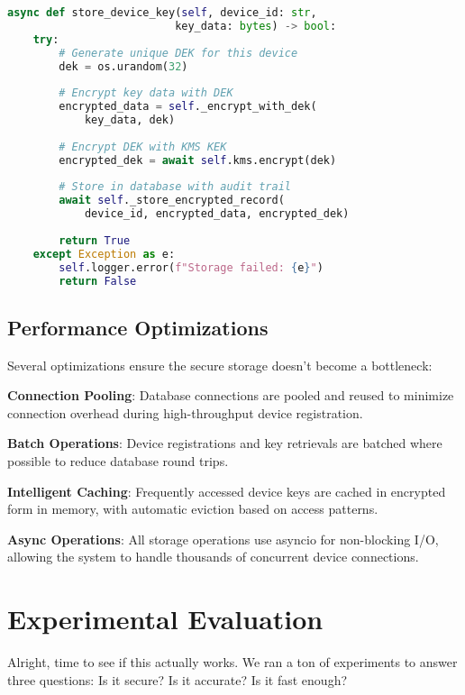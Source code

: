 \documentclass[onecolumn,11pt]{article}
\begin{document}
\begin{lstlisting}[language=Python, basicstyle=\footnotesize\ttfamily]
async def store_device_key(self, device_id: str, 
                          key_data: bytes) -> bool:
    try:
        # Generate unique DEK for this device
        dek = os.urandom(32)
        
        # Encrypt key data with DEK
        encrypted_data = self._encrypt_with_dek(
            key_data, dek)
        
        # Encrypt DEK with KMS KEK  
        encrypted_dek = await self.kms.encrypt(dek)
        
        # Store in database with audit trail
        await self._store_encrypted_record(
            device_id, encrypted_data, encrypted_dek)
            
        return True
    except Exception as e:
        self.logger.error(f"Storage failed: {e}")
        return False
\end{lstlisting}

\subsection{Performance Optimizations}

Several optimizations ensure the secure storage doesn't become a bottleneck:

\textbf{Connection Pooling}: Database connections are pooled and reused to minimize connection overhead during high-throughput device registration.

\textbf{Batch Operations}: Device registrations and key retrievals are batched where possible to reduce database round trips.

\textbf{Intelligent Caching}: Frequently accessed device keys are cached in encrypted form in memory, with automatic eviction based on access patterns.

\textbf{Async Operations}: All storage operations use asyncio for non-blocking I/O, allowing the system to handle thousands of concurrent device connections.

\section{Experimental Evaluation}
\label{sec:evaluation}

Alright, time to see if this actually works. We ran a ton of experiments to answer three questions: Is it secure? Is it accurate? Is it fast enough?
\end{document}

